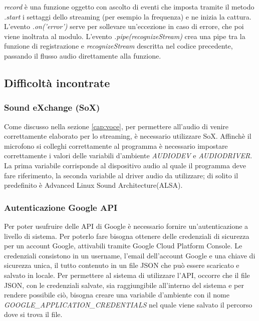 \emph{record} \`e una funzione oggetto con ascolto di eventi che
imposta tramite il metodo \emph{.start} i settaggi dello streaming (per esempio la frequenza) e ne inizia la cattura.
L'evento \emph{.on('error')} serve per sollevare un'eccezione in caso di errore, che poi viene inoltrata al modulo.
L'evento \emph{.pipe(recognizeStream)} crea una pipe tra la funzione di registrazione e \emph{recognizeStream} descritta nel codice precedente,
passando il flusso audio direttamente alla funzione.

\subsection{Difficolt\`a incontrate}
\subsubsection{Sound eXchange (SoX)}\label{cap:sox}
Come discusso nella sezione \ref{cap:voce}, per permettere all'audio di venire correttamente elaborato
per lo streaming, \`e necessario utilizzare SoX.
Affinch\`e il microfono si colleghi correttamente al programma \`e necessario impostare correttamente
i valori delle variabili d'ambiente \textit{AUDIODEV} e \textit{AUDIODRIVER}.
La prima variabile corrisponde al dispositivo audio al quale il programma deve fare riferimento,
la seconda variabile al driver audio da utilizzare; di solito il predefinito \`e Advanced Linux Sound Architecture(ALSA).

\subsubsection{Autenticazione Google API}\label{cap:google}
Per poter usufruire delle API di Google \`e necessario fornire un'autenticazione a livello
di sistema.
Per poterlo fare bisogna ottenere delle credenziali di sicurezza per un account Google,
attivabili tramite Google Cloud Platform Console.
Le credenziali consistono in un username, l'email dell'account Google e una chiave di sicurezza unica,
 il tutto contenuto in un file JSON che pu\`o essere scaricato e salvato in locale.
Per permettere al sistema di utilizzare l'API, occorre che il file JSON, con le credenziali salvate, sia
raggiungibile all'interno del sistema e per rendere possibile ci\`o, bisogna creare una variabile d'ambiente
con il nome \emph{GOOGLE\_APPLICATION\_CREDENTIALS} nel quale viene salvato il percorso dove si trova il file.

